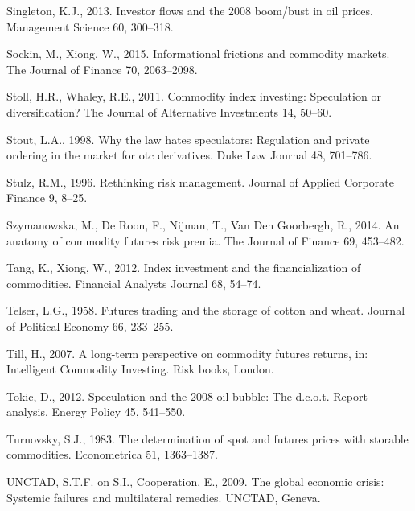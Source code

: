 \documentclass[]{elsarticle} %
\begin{document}
\leavevmode\hypertarget{ref-singleton_investor_2013}{}%
Singleton, K.J., 2013. Investor flows and the 2008 boom/bust in oil prices. Management Science 60, 300--318.

\leavevmode\hypertarget{ref-sockin_informational_2015}{}%
Sockin, M., Xiong, W., 2015. Informational frictions and commodity markets. The Journal of Finance 70, 2063--2098.

\leavevmode\hypertarget{ref-stoll_commodity_2011}{}%
Stoll, H.R., Whaley, R.E., 2011. Commodity index investing: Speculation or diversification? The Journal of Alternative Investments 14, 50--60.

\leavevmode\hypertarget{ref-stout_why_1998}{}%
Stout, L.A., 1998. Why the law hates speculators: Regulation and private ordering in the market for otc derivatives. Duke Law Journal 48, 701--786.

\leavevmode\hypertarget{ref-stulz_rethink_1996}{}%
Stulz, R.M., 1996. Rethinking risk management. Journal of Applied Corporate Finance 9, 8--25.

\leavevmode\hypertarget{ref-szymanowska_anatomy_2014}{}%
Szymanowska, M., De Roon, F., Nijman, T., Van Den Goorbergh, R., 2014. An anatomy of commodity futures risk premia. The Journal of Finance 69, 453--482.

\leavevmode\hypertarget{ref-tang_index_2012}{}%
Tang, K., Xiong, W., 2012. Index investment and the financialization of commodities. Financial Analysts Journal 68, 54--74.

\leavevmode\hypertarget{ref-telser_futures_1958}{}%
Telser, L.G., 1958. Futures trading and the storage of cotton and wheat. Journal of Political Economy 66, 233--255.

\leavevmode\hypertarget{ref-till_long_2007}{}%
Till, H., 2007. A long-term perspective on commodity futures returns, in: Intelligent Commodity Investing. Risk books, London.

\leavevmode\hypertarget{ref-tokic_speculation_2012}{}%
Tokic, D., 2012. Speculation and the 2008 oil bubble: The d.c.o.t. Report analysis. Energy Policy 45, 541--550.

\leavevmode\hypertarget{ref-turnovsky_determination_1983}{}%
Turnovsky, S.J., 1983. The determination of spot and futures prices with storable commodities. Econometrica 51, 1363--1387.

\leavevmode\hypertarget{ref-unctad_global_2009}{}%
UNCTAD, S.T.F. on S.I., Cooperation, E., 2009. The global economic crisis: Systemic failures and multilateral remedies. UNCTAD, Geneva.
\end{document}

